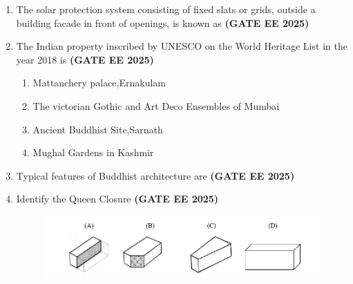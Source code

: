 \documentclass[journal,12pt,onecolumn]{IEEEtran}
\theoremstyle{remark}
\begin{document}
\begin{enumerate}
\begin{enumerate}
\end{enumerate}
\item The solar protection system consisting of fixed slats or grids, outside a building facade in front of openings, is known as \hfill \textbf{(GATE EE 2025)} 
\begin{enumerate}
\end{enumerate}
\item The Indian property inscribed by UNESCO on the World Heritage List in the year 2018 is \hfill \textbf{(GATE EE 2025)}
\begin{enumerate}
    \item Mattanchery palace,Ernakulam
    \item The victorian Gothic and Art Deco Ensembles of Mumbai
    \item Ancient Buddhist Site,Sarnath
    \item Mughal Gardens in Kashmir
\end{enumerate}
\item Typical features of Buddhist architecture are \hfill \textbf{(GATE EE 2025)}
\begin{enumerate}
\end{enumerate}
\item Identify the Queen Closure \hfill \textbf{(GATE EE 2025)}
\begin{figure}[H]
    \centering
    \includegraphics[width=0.5\linewidth]{figs/fig1.png}

\end{figure}
\end{enumerate}
\end{document}
